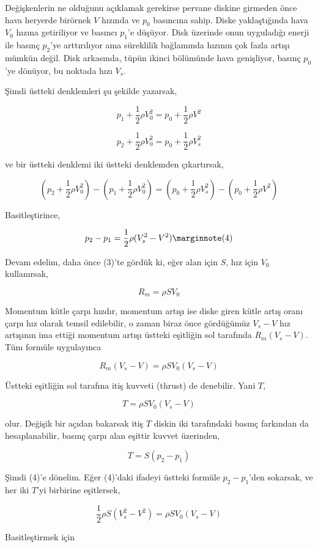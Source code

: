 \documentclass[12pt,fleqn]{article}\usepackage{../../common}
\begin{document}
Değişkenlerin ne olduğunu açıklamak gerekirse pervane diskine girmeden önce
hava heryerde birörnek $V$ hızında ve $p_0$ basıncına sahip. Diske
yaklaştığında hava $V_0$ hızına getiriliyor ve basıncı $p_1$'e
düşüyor. Disk üzerinde onun uyguladığı enerji ile basınç $p_2$'ye
arttırılıyor ama süreklilik bağlamında hızının çok fazla artışı mümkün
değil. Disk arkasında, tüpün ikinci bölümünde hava genişliyor, basınç
$p_0$'ye dönüyor, bu noktada hızı $V_s$.

Şimdi üstteki denklemleri şu şekilde yazarsak, 

$$
p_1 + \frac{1}{2} \rho V_0^2 = p_0 + \frac{1}{2} \rho V^2
$$

$$
p_2 + \frac{1}{2} \rho V_0^2 = p_0 + \frac{1}{2} \rho V_s^2
$$

ve bir üstteki denklemi iki üstteki denklemden çıkartırsak, 

$$
\left(p_2 + \frac{1}{2} \rho V_0^2 \right) - 
\left(p_1 + \frac{1}{2} \rho V_0^2 \right) = 
\left(p_0 + \frac{1}{2} \rho V_s^2 \right) - 
\left(p_0 + \frac{1}{2} \rho V^2 \right)
$$

Basitleştirince,

$$
p_2 - p_1 = \frac{1}{2} \rho (V_s^2 - V^2)
\mlabel{4}
$$

Devam edelim, daha önce (3)'te gördük ki, eğer alan için $S$, hız için
$V_0$ kullanırsak, 

$$
R_m = \rho S V_0
$$

Momentum kütle çarpı hızdır, momentum artışı ise diske giren kütle artış
oranı çarpı hız olarak temsil edilebilir, o zaman biraz önce gördüğümüz
$V_s-V$ hız artışının ima ettiği momentum artışı üstteki eşitliğin sol
tarafında $R_m (V_s - V)$. Tüm formüle uygulayınca 

$$
R_m (V_s - V) = \rho S V_0  (V_s - V)
$$

Üstteki eşitliğin sol tarafına itiş kuvveti (thrust) de denebilir. Yani
$T$,

$$
T = \rho S V_0  (V_s - V)
$$

olur. Değişik bir açıdan bakarsak itiş $T$ diskin iki tarafındaki basınç
farkından da hesaplanabilir, basınç çarpı alan eşittir kuvvet üzerinden,

$$
T = S (p_2 - p_1)
$$

Şimdi (4)'e dönelim. Eğer (4)'daki ifadeyi üstteki formüle $p_2-p_1$'den
sokarsak, ve her iki $T$'yi birbirine eşitlersek, 

$$
\frac{1}{2} \rho S (V_s^2 - V^2) = \rho S V_0 (V_s - V)
$$

Basitleştirmek için
\end{document}
